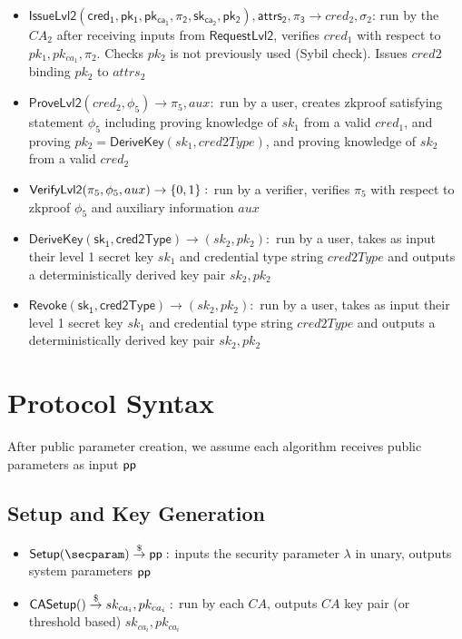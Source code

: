 \begin{itemize}
    \item $\mathsf{IssueLvl2(cred_1, pk_1,  pk_{ca_1}, \pi_{2}, sk_{ca_2}, pk_2), attrs_2, \pi_{3}} \to cred_2, \sigma_2$: run by the $CA_2$ after receiving inputs from $\mathsf{RequestLvl2}$, verifies $cred_1$ with respect to $pk_1, pk_{ca_1}, \pi_2$. Checks $pk_2$ is not previously used (Sybil check). Issues $cred2$ binding $pk_2$ to $attrs_2$

    \item $\mathsf{ProveLvl2}(cred_2, \phi_5) \to \pi_5, aux:$ run by a user, creates zkproof satisfying statement $\phi_5$ including proving knowledge of $sk_1$ from a valid $cred_1$, and proving $pk_2 = \mathsf{DeriveKey}(sk_1, cred2Type)$, and proving knowledge of $sk_2$ from a valid $cred_2$

    \item $\mathsf{VerifyLvl2}(\pi_5, \phi_5, aux) \to \{0,1\}: $ run by a verifier, verifies $\pi_5$ with respect to zkproof $\phi_5$ and auxiliary information $aux$

    \item $\mathsf{DeriveKey(sk_1, cred2Type)} \to (sk_2, pk_2):$ run by a user, takes as input their level 1 secret key $sk_1$ and credential type string $cred2Type$ and outputs a deterministically derived key pair $sk_2, pk_2$

    \item $\mathsf{Revoke(sk_1, cred2Type)} \to (sk_2, pk_2):$ run by a user, takes as input their level 1 secret key $sk_1$ and credential type string $cred2Type$ and outputs a deterministically derived key pair $sk_2, pk_2$

\end{itemize}




\section{Protocol Syntax}
After public parameter creation, we assume each algorithm receives public parameters as input $\mathsf{pp}$
\subsection{Setup and Key Generation}
\begin{itemize}
    \item $\mathsf{Setup}(\secparam) \torand \ppar:$ inputs the security parameter $\lambda$ in unary, outputs system parameters $\mathsf{pp}$

    \item $\mathsf{CASetup}() \stackrel{\$}{\to} sk_{ca_i}, pk_{ca_i}:$ run by each $CA$, outputs $CA$ key pair (or threshold based) $sk_{ca_i}, pk_{ca_i}$
\end{itemize}

